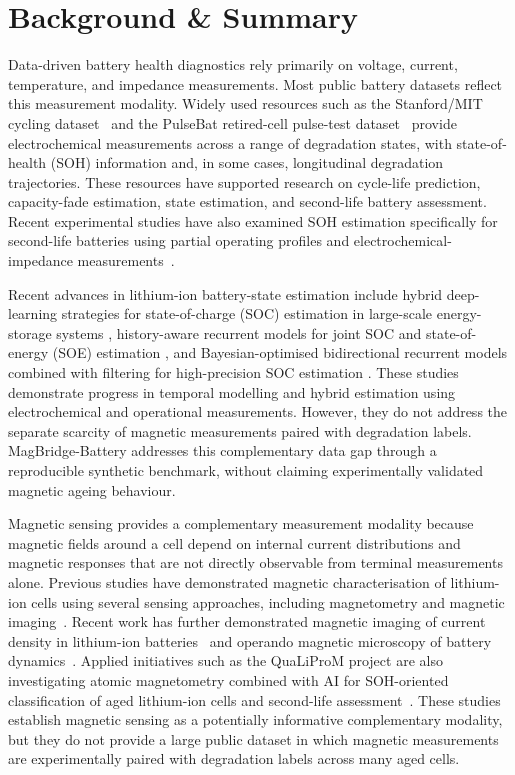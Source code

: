 \documentclass[11pt]{article}
\begin{document}
\section*{Background \& Summary}

Data-driven battery health diagnostics rely primarily on
voltage, current, temperature, and impedance measurements.
Most public battery datasets reflect this measurement modality. Widely used resources such as the Stanford/MIT cycling dataset~\cite{severson2019} and the PulseBat retired-cell pulse-test dataset~\cite{tao2024pulsebat,tao2024pulsebatdata} provide electrochemical measurements across a range of degradation states, with state-of-health (SOH) information and, in some cases, longitudinal degradation trajectories. These resources have supported research on cycle-life prediction, capacity-fade estimation, state estimation, and second-life battery assessment. Recent experimental studies have also examined SOH estimation specifically
for second-life batteries using partial operating profiles and
electrochemical-impedance measurements~\cite{braco2022secondlife,
camboim2024secondlife}.

Recent advances in lithium-ion battery-state estimation
include hybrid deep-learning strategies for state-of-charge (SOC) estimation in large-scale energy-storage systems
\cite{wang2026hybrid}, history-aware recurrent models
for joint SOC and state-of-energy (SOE) estimation \cite{wang2025hlhgur}, and Bayesian-optimised bidirectional recurrent models combined with filtering for high-precision SOC estimation \cite{wang2025bilstm}. These studies demonstrate progress in temporal modelling and hybrid estimation using electrochemical and operational measurements. However, they do not address the separate scarcity of magnetic measurements paired with degradation labels. MagBridge-Battery addresses this complementary
data gap through a reproducible synthetic benchmark,
without claiming experimentally validated magnetic
ageing behaviour.

Magnetic sensing provides a complementary measurement modality because magnetic fields around a cell depend on internal current distributions and magnetic responses that are not directly observable from terminal measurements alone. Previous studies have demonstrated magnetic characterisation of lithium-ion cells using several sensing approaches, including magnetometry and magnetic imaging~\cite{ilott2018,romanenko2020,hu2020,ilott2017,nature2025magnetic,aachen2025}. Recent work has further demonstrated magnetic imaging of current density in
lithium-ion batteries~\cite{aachen2025} and operando magnetic microscopy of
battery dynamics~\cite{nature2025magnetic}. Applied initiatives such as the QuaLiProM project are also investigating atomic magnetometry combined with AI for SOH-oriented classification of aged lithium-ion cells and second-life
assessment~\cite{qualiprom}. These studies establish magnetic sensing as a potentially informative complementary modality, but they do not provide a large public dataset in which magnetic measurements are experimentally paired with degradation labels across many aged cells.
\end{document}
